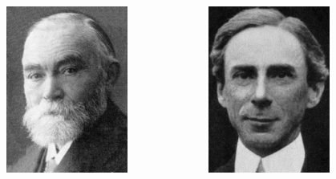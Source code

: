 \documentclass[aspectratio=169]{beamer}
\begin{document}
\begin{frame}
\begin{columns}
\begin{itemize}
\end{itemize}


\begin{figure}
\includegraphics[scale=0.45]{frege}
\end{figure}

\begin{figure}
\includegraphics[scale=0.45]{russel}
\end{figure}
    
\end{columns}
\end{frame}
\end{document}
